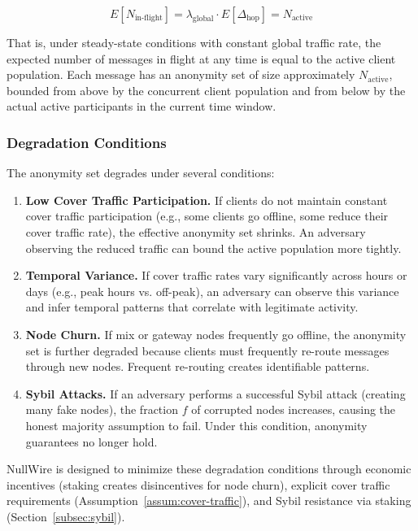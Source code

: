\documentclass[11pt]{article}
\theoremstyle{definition}
\theoremstyle{remark}
\begin{document}
\begin{equation}
E[N_{\text{in-flight}}] = \lambda_{\text{global}} \cdot E[\Delta_{\text{hop}}] = N_{\text{active}}
\label{eq:anon-set}
\end{equation}

That is, under steady-state conditions with constant global traffic rate, the expected number of messages in flight at any time is equal to the active client population. Each message has an anonymity set of size approximately $N_{\text{active}}$, bounded from above by the concurrent client population and from below by the actual active participants in the current time window.

\subsubsection{Degradation Conditions}

The anonymity set degrades under several conditions:

\begin{enumerate}
    \item \textbf{Low Cover Traffic Participation.} If clients do not maintain constant cover traffic participation (e.g., some clients go offline, some reduce their cover traffic rate), the effective anonymity set shrinks. An adversary observing the reduced traffic can bound the active population more tightly.

    \item \textbf{Temporal Variance.} If cover traffic rates vary significantly across hours or days (e.g., peak hours vs. off-peak), an adversary can observe this variance and infer temporal patterns that correlate with legitimate activity.

    \item \textbf{Node Churn.} If mix or gateway nodes frequently go offline, the anonymity set is further degraded because clients must frequently re-route messages through new nodes. Frequent re-routing creates identifiable patterns.

    \item \textbf{Sybil Attacks.} If an adversary performs a successful Sybil attack (creating many fake nodes), the fraction $f$ of corrupted nodes increases, causing the honest majority assumption to fail. Under this condition, anonymity guarantees no longer hold.
\end{enumerate}

NullWire is designed to minimize these degradation conditions through economic incentives (staking creates disincentives for node churn), explicit cover traffic requirements (Assumption~\ref{assum:cover-traffic}), and Sybil resistance via staking (Section~\ref{subsec:sybil}).
\end{document}
